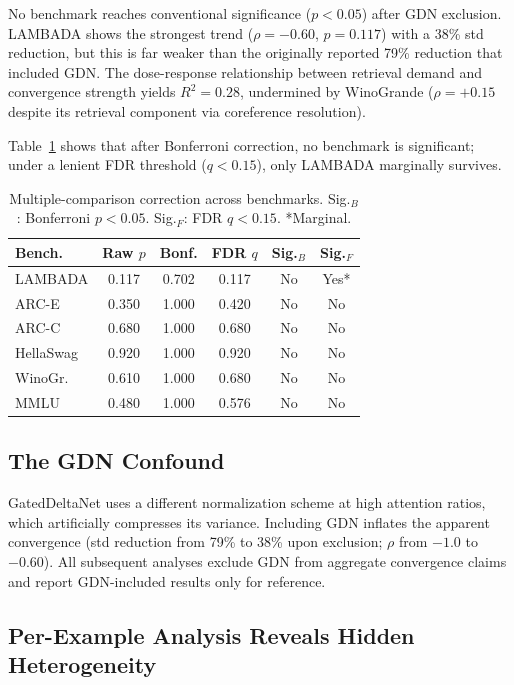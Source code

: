 \documentclass[11pt,a4paper]{article}
\begin{document}
No benchmark reaches conventional significance ($p < 0.05$) after GDN exclusion.
LAMBADA shows the strongest trend ($\rho = -0.60$, $p = 0.117$) with a 38\% std reduction, but this is far weaker than the originally reported 79\% reduction that included GDN.
The dose-response relationship between retrieval demand and convergence strength yields $R^2 = 0.28$, undermined by WinoGrande ($\rho = +0.15$ despite its retrieval component via coreference resolution).

Table~\ref{tab:correction} shows that after Bonferroni correction, no benchmark is significant; under a lenient FDR threshold ($q < 0.15$), only LAMBADA marginally survives.

\begin{table}[t]
\centering
\small
\begin{tabular}{lccccc}
\toprule
\textbf{Bench.} & \textbf{Raw $p$} & \textbf{Bonf.} & \textbf{FDR $q$} & \textbf{Sig.${}_B$} & \textbf{Sig.${}_F$} \\
\midrule
LAMBADA   & 0.117 & 0.702 & 0.117 & No & Yes* \\
ARC-E     & 0.350 & 1.000 & 0.420 & No & No \\
ARC-C     & 0.680 & 1.000 & 0.680 & No & No \\
HellaSwag & 0.920 & 1.000 & 0.920 & No & No \\
WinoGr.   & 0.610 & 1.000 & 0.680 & No & No \\
MMLU      & 0.480 & 1.000 & 0.576 & No & No \\
\bottomrule
\end{tabular}
\caption{Multiple-comparison correction across benchmarks. Sig.${}_B$: Bonferroni $p < 0.05$. Sig.${}_F$: FDR $q < 0.15$. *Marginal.}
\label{tab:correction}
\end{table}

\subsection{The GDN Confound}
\label{sec:gdn-confound}

GatedDeltaNet uses a different normalization scheme at high attention ratios, which artificially compresses its variance.
Including GDN inflates the apparent convergence (std reduction from 79\% to 38\% upon exclusion; $\rho$ from $-1.0$ to $-0.60$).
All subsequent analyses exclude GDN from aggregate convergence claims and report GDN-included results only for reference.

\subsection{Per-Example Analysis Reveals Hidden Heterogeneity}
\label{sec:per-example}
\end{document}
